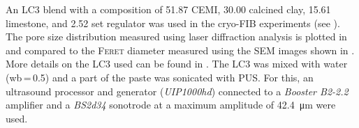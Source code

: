 An \ac{LC3} blend with a composition of \qty{51.87}{\wtpercent} \acs{CEMI}, \qty{30.00}{\wtpercent} calcined clay, \qty{15.61}{\wtpercent} limestone, and \qty{2.52}{\wtpercent} set regulator was used in the cryo-\ac{FIB} experiments (see ).
The pore size distribution measured using laser diffraction analysis is plotted in  and compared to the \textsc{Feret} diameter measured using the \ac{SEM} images shown in .
More details on the \ac{LC3} used can be found in \cite{pott.2023}.
The \ac{LC3} was mixed with water (\ac{wb}\,=\,\num{0.5}) and a part of the paste was sonicated with \ac{PUS}.
For this, an ultrasound processor and generator (\textit{UIP1000hd}) connected to a \textit{Booster B2-2.2} amplifier and a \textit{BS2d34} sonotrode at a maximum amplitude of \qty{42.4}{\micro\meter} were used.

